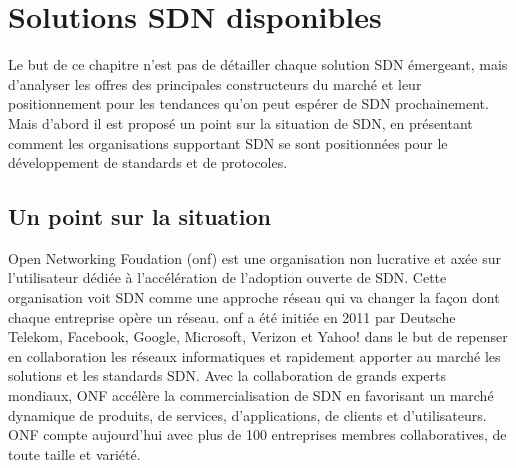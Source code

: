 \chapter{Solutions SDN disponibles}

Le but de ce chapitre n'est pas de détailler chaque solution SDN émergeant, mais d'analyser les offres des principales constructeurs du marché et leur positionnement pour les tendances qu'on peut espérer de SDN prochainement.
Mais d'abord il est proposé un point sur la situation de SDN, en présentant comment les organisations supportant SDN se sont positionnées pour le développement de standards et de protocoles.




\section{Un point sur la situation}




Open Networking Foudation (\gls{onf}) est une organisation non lucrative et axée sur l'utilisateur dédiée à l'accélération de l'adoption ouverte de SDN. Cette organisation voit SDN comme une approche réseau qui va changer la façon dont chaque entreprise opère un réseau.
\gls{onf} a été initiée en 2011 par Deutsche Telekom, Facebook, Google, Microsoft, Verizon et Yahoo! dans le but de repenser en collaboration les réseaux informatiques et rapidement apporter au marché les solutions et les standards SDN. Avec la collaboration de  grands experts mondiaux, ONF accélère la commercialisation de SDN en favorisant un  marché dynamique de produits, de services, d'applications, de clients et d'utilisateurs. ONF compte aujourd'hui avec plus de 100 entreprises membres collaboratives, de toute taille et variété. \cite{ONFOverview}

